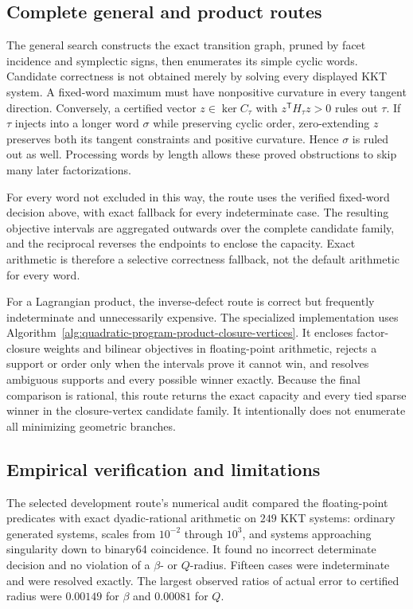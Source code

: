 \subsection{Complete general and product routes}

The general search constructs the exact transition graph, pruned by facet
incidence and symplectic signs, then enumerates its simple cyclic words. Candidate
correctness is not obtained merely by solving every displayed KKT system.  A
fixed-word maximum must have nonpositive curvature in every tangent direction.
Conversely, a certified vector \(z\in\ker C_\tau\) with
\(z^{\mathsf T}H_\tau z>0\) rules out \(\tau\).  If \(\tau\) injects into a
longer word \(\sigma\) while preserving cyclic order, zero-extending \(z\)
preserves both its tangent constraints and positive curvature.  Hence
\(\sigma\) is ruled out as well.  Processing words by length allows these
proved obstructions to skip many later factorizations.

For every word not excluded in this way, the route uses the verified
fixed-word decision above, with exact fallback for every indeterminate case.
The resulting objective intervals are aggregated outwards over the complete
candidate family, and the reciprocal reverses the endpoints to enclose the
capacity.  Exact arithmetic is therefore a selective correctness fallback,
not the default arithmetic for every word.

For a Lagrangian product, the inverse-defect route is correct but frequently
indeterminate and unnecessarily expensive.  The specialized implementation
uses Algorithm~\ref{alg:quadratic-program-product-closure-vertices}.  It
encloses factor-closure weights and bilinear objectives in floating-point
arithmetic, rejects a support or order only when the intervals prove it cannot
win, and resolves ambiguous supports and every possible winner exactly.
Because the final comparison is rational, this route returns the exact
capacity and every tied sparse winner in the closure-vertex candidate family.
It intentionally does not enumerate all minimizing geometric branches.

\subsection{Empirical verification and limitations}

The selected development route's numerical audit compared the floating-point predicates with exact
dyadic-rational arithmetic on \(249\) KKT systems: ordinary generated systems,
scales from \(10^{-2}\) through \(10^3\), and systems approaching singularity
down to binary64 coincidence.  It found no incorrect determinate decision and
no violation of a \(\beta\)- or \(Q\)-radius.  Fifteen cases were
indeterminate and were resolved exactly.  The largest observed ratios of
actual error to certified radius were \(0.00149\) for \(\beta\) and
\(0.00081\) for \(Q\).

